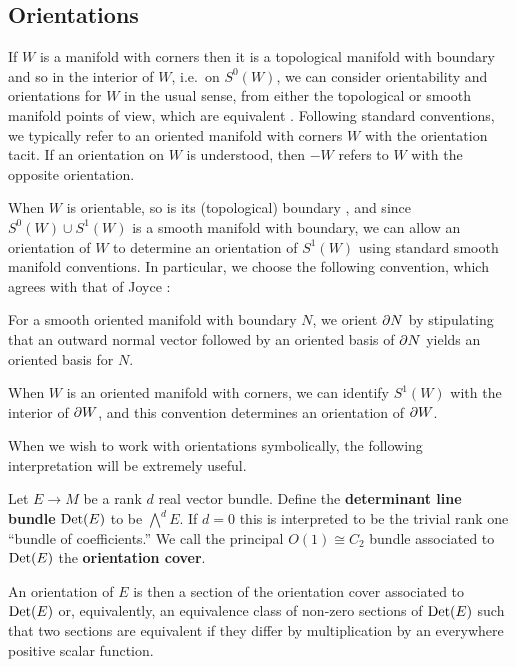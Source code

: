 \subsection{Orientations}\label{S: orientations}

If $W$ is a manifold with corners then it is a topological manifold with boundary and so in the interior of $W$, i.e.\ on $S^0(W)$, we can consider orientability and orientations for $W$ in the usual sense, from either the topological or smooth manifold points of view, which are equivalent \cite[Theorem VI.7.15]{Bred97}.
Following standard conventions, we typically refer to an oriented manifold with corners $W$ with the orientation tacit.
If an orientation on $W$ is understood, then $-W$ refers to $W$ with the opposite orientation.

When $W$ is orientable, so is its (topological) boundary \cite[Lemma 6.9.1]{Bred97}, and since $S^0(W) \cup S^1(W)$ is a smooth manifold with boundary, we can allow an orientation of $W$ to determine an orientation of $S^1(W)$ using standard smooth manifold conventions.
In particular, we choose the following convention, which agrees with that of Joyce \cite[Convention 7.2.a]{Joy12}:

\begin{convention}\label{Con: oriented boundary}
	For a smooth oriented manifold with boundary $N$, we orient $\partial N$ by stipulating that an outward normal vector followed by an oriented basis of $\partial N$ yields an oriented basis for $N$.
\end{convention}

When $W$ is an oriented manifold with corners, we can identify $S^1(W)$ with the interior of $\partial W$, and this convention determines an orientation of $\partial W$.

When we wish to work with orientations symbolically, the following interpretation will be extremely useful.

\begin{definition}\label{D: det bundle}
	Let $E \to M$ be a rank $d$ real vector bundle.
	Define the \textbf{determinant line bundle}
	${\rm Det}(E)$ to be $\bigwedge^d E$.
	If $d = 0$ this is interpreted to be the trivial rank one ``bundle of coefficients.''
	We call the principal $O(1) \cong C_2$ bundle associated to ${\rm Det}(E)$ the \textbf{orientation cover}.

	An orientation of $E$ is then a section of the orientation cover associated to ${\rm Det}(E)$ or, equivalently, an equivalence class of non-zero sections of ${\rm Det}(E)$ such that two sections are equivalent if they differ by multiplication by an everywhere positive scalar function.
\end{definition}


